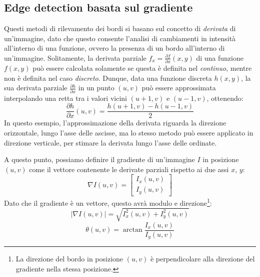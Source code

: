 \subsection{Edge detection basata sul gradiente}
\label{subsec:gradient-based-edge-detection}
Questi metodi di rilevamento dei bordi si basano sul concetto di \textit{derivata} di un'immagine, dato che questo consente l'analisi di cambiamenti in intensit\`a all'interno di una funzione, ovvero la presenza di un bordo all'interno di un'immagine. Solitamente, la derivata parziale $f_{x}=\frac{\partial f}{\partial x}(x, y)$ di una funzione $f(x, y)$ pu\`o essere calcolata solamente se questa \`e  definita nel \textit{continuo}, mentre non \`e definita nel caso \textit{discreto}. Dunque, data una funzione discreta $h(x, y)$, la sua derivata parziale $\frac{\partial h}{\partial x}$ in un punto $(u, v)$ pu\`o essere approssimata interpolando una retta tra i valori vicini $(u + 1, v)$ e $(u - 1, v)$, ottenendo:
\begin{equation}
	\frac{\partial h}{\partial x}(u, v) = \frac{h(u + 1, v) - h(u - 1, v)}{2}
	\label{eq:image-derivative}
\end{equation}
In questo esempio, l'approssimazione della derivata riguarda la direzione orizzontale, lungo l'asse delle ascisse, ma lo stesso metodo pu\`o essere applicato in direzione verticale, per stimare la derivata lungo l'asse delle ordinate.\par
A questo punto, possiamo definire il gradiente di un'immagine $I$ in posizione $(u, v)$ come il vettore contenente le derivate parziali rispetto ai due assi $x$, $y$:
\begin{equation}
	\nabla I(u, v) = 
		\begin{bmatrix}
			I_{x}(u, v) \\ I_{y}(u, v)
		\end{bmatrix}
	\label{eq:image-gradient}
\end{equation}
Dato che il gradiente \`e un vettore, questo avr\`a modulo e direzione\footnote{La direzione del bordo in posizione $(u, v)$ \`e perpendicolare alla direzione del gradiente nella stessa posizione.}:
\begin{equation}
	|\nabla I(u, v)| = \sqrt{I_{x}^{2}(u, v)+I_{y}^{2}(u, v)}
	\label{eq:image-gradient-magnitude}
\end{equation}
\begin{equation}
	\theta (u, v) = \arctan{\frac{I_{x}(u, v)}{I_{y}(u, v)}}
	\label{eq:image-gradient-direction}
\end{equation}\par
